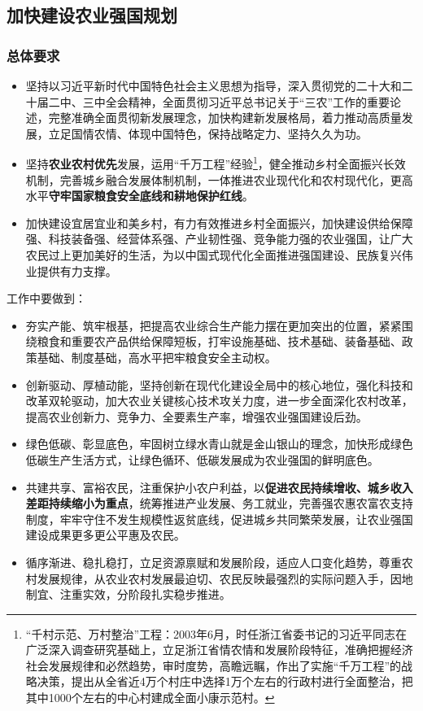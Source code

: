 \subsection{加快建设农业强国规划}

\subsubsection{总体要求}

\begin{itemize}
    \item 坚持以习近平新时代中国特色社会主义思想为指导，深入贯彻党的二十大和二十届二中、三中全会精神，全面贯彻习近平总书记关于“三农”工作的重要论述，完整准确全面贯彻新发展理念，加快构建新发展格局，着力推动高质量发展，立足国情农情、体现中国特色，保持战略定力、坚持久久为功。
      \item 坚持\textbf{农业农村优先}发展，运用“千万工程”经验\footnote{“千村示范、万村整治”工程：2003年6月，时任浙江省委书记的习近平同志在广泛深入调查研究基础上，立足浙江省情农情和发展阶段特征，准确把握经济社会发展规律和必然趋势，审时度势，高瞻远瞩，作出了实施“千万工程”的战略决策，提出从全省近4万个村庄中选择1万个左右的行政村进行全面整治，把其中1000个左右的中心村建成全面小康示范村。}，健全推动乡村全面振兴长效机制，完善城乡融合发展体制机制，一体推进农业现代化和农村现代化，更高水平\textbf{守牢国家粮食安全底线和耕地保护红线}。
  \item 加快建设宜居宜业和美乡村，有力有效推进乡村全面振兴，加快建设供给保障强、科技装备强、经营体系强、产业韧性强、竞争能力强的农业强国，让广大农民过上更加美好的生活，为以中国式现代化全面推进强国建设、民族复兴伟业提供有力支撑。
\end{itemize}

工作中要做到：

\begin{itemize}
    \item 夯实产能、筑牢根基，把提高农业综合生产能力摆在更加突出的位置，紧紧围绕粮食和重要农产品供给保障短板，打牢设施基础、技术基础、装备基础、政策基础、制度基础，高水平把牢粮食安全主动权。
    \item 创新驱动、厚植动能，坚持创新在现代化建设全局中的核心地位，强化科技和改革双轮驱动，加大农业关键核心技术攻关力度，进一步全面深化农村改革，提高农业创新力、竞争力、全要素生产率，增强农业强国建设后劲。
    \item 绿色低碳、彰显底色，牢固树立绿水青山就是金山银山的理念，加快形成绿色低碳生产生活方式，让绿色循环、低碳发展成为农业强国的鲜明底色。
    \item 共建共享、富裕农民，注重保护小农户利益，以\textbf{促进农民持续增收、城乡收入差距持续缩小为重点}，统筹推进产业发展、务工就业，完善强农惠农富农支持制度，牢牢守住不发生规模性返贫底线，促进城乡共同繁荣发展，让农业强国建设成果更多更公平惠及农民。
    \item 循序渐进、稳扎稳打，立足资源禀赋和发展阶段，适应人口变化趋势，尊重农村发展规律，从农业农村发展最迫切、农民反映最强烈的实际问题入手，因地制宜、注重实效，分阶段扎实稳步推进。
\end{itemize}

